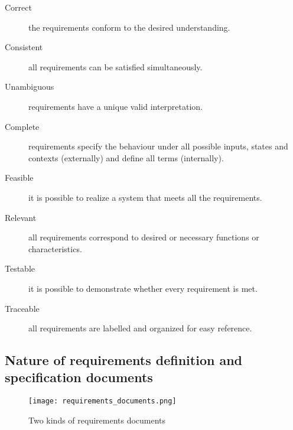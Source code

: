 \begin{description}
    \item[Correct] the requirements conform to the desired understanding.
    \item[Consistent] all requirements can be satisfied simultaneously.
    \item[Unambiguous] requirements have a unique valid interpretation.
    \item[Complete] requirements specify the behaviour under all possible inputs, states and
contexts (externally) and define all terms (internally).
    \item[Feasible] it is possible to realize a system that meets all the requirements.
    \item[Relevant] all requirements correspond to desired or necessary functions or
characteristics.
    \item[Testable] it is possible to demonstrate whether every requirement is met.
    \item[Traceable] all requirements are labelled and organized for easy reference.
\end{description}

\subsection{Nature of requirements definition and specification documents}

\begin{figure}[!ht]
    \centering
    \texttt{[image: requirements\_documents.png]}
    \caption{Two kinds of requirements documents}
\end{figure}
\FloatBarrier{}


